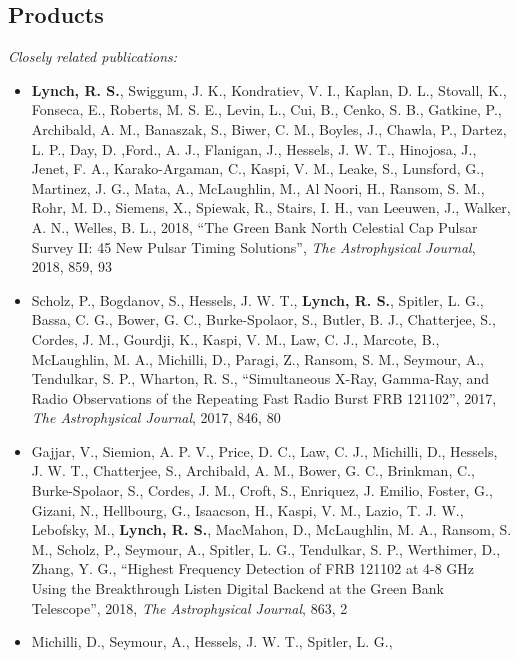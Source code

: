 \documentclass[10pt]{NSF}
\begin{document}
\subsection*{\normalsize Products}

\textit{Closely related publications:}
\vspace{-1em}
\begin{itemize}
\item{\textbf{Lynch, R. S.}, Swiggum, J. K., Kondratiev, V. I.,
  Kaplan, D. L., Stovall, K., Fonseca, E., Roberts, M. S. E., Levin,
  L., Cui, B., Cenko, S. B., Gatkine, P., Archibald, A. M., Banaszak,
  S., Biwer, C. M., Boyles, J., Chawla, P., Dartez, L. P., Day,
  D. ,Ford., A. J., Flanigan, J., Hessels, J. W. T., Hinojosa, J.,
  Jenet, F. A., Karako-Argaman, C., Kaspi, V. M., Leake, S., Lunsford,
  G., Martinez, J. G., Mata, A., McLaughlin, M., Al Noori, H., Ransom,
  S. M., Rohr, M. D., Siemens, X., Spiewak, R., Stairs, I. H., van
  Leeuwen, J., Walker, A. N., Welles, B. L., 2018, ``The Green Bank
  North Celestial Cap Pulsar Survey II: 45 New Pulsar Timing
  Solutions'', \emph{The Astrophysical Journal}, 2018, 859, 93}
\item{Scholz, P., Bogdanov, S., Hessels, J. W. T., \textbf{Lynch,
    R. S.}, Spitler, L. G., Bassa, C. G., Bower, G. C., Burke-Spolaor,
  S., Butler, B. J., Chatterjee, S., Cordes, J. M., Gourdji, K.,
  Kaspi, V. M., Law, C. J., Marcote, B., McLaughlin, M. A., Michilli,
  D., Paragi, Z., Ransom, S. M., Seymour, A., Tendulkar, S. P.,
  Wharton, R. S., ``Simultaneous X-Ray, Gamma-Ray, and Radio
  Observations of the Repeating Fast Radio Burst FRB 121102'', 2017,
  \emph{The Astrophysical Journal}, 2017, 846, 80}
\item{Gajjar, V., Siemion, A. P. V., Price, D. C., Law, C. J.,
  Michilli, D., Hessels, J. W. T., Chatterjee, S., Archibald, A. M.,
  Bower, G. C., Brinkman, C., Burke-Spolaor, S., Cordes, J. M., Croft,
  S., Enriquez, J. Emilio, Foster, G., Gizani, N., Hellbourg, G.,
  Isaacson, H., Kaspi, V. M., Lazio, T. J. W., Lebofsky, M.,
  \textbf{Lynch, R. S.}, MacMahon, D., McLaughlin, M. A., Ransom,
  S. M., Scholz, P., Seymour, A., Spitler, L. G., Tendulkar, S. P.,
  Werthimer, D., Zhang, Y. G., ``Highest Frequency Detection of FRB
  121102 at 4-8 GHz Using the Breakthrough Listen Digital Backend at
  the Green Bank Telescope'', 2018, \emph{The Astrophysical Journal},
  863, 2}
\item{Michilli, D., Seymour, A., Hessels, J. W. T., Spitler, L. G.,
}
\end{itemize}
\end{document}
